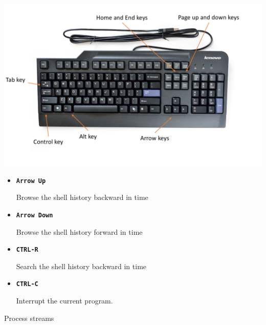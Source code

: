 \documentclass[aspectratio=1610]{beamer}
\newcommand\curtitle{}
\newcommand\command[1]{\alert{\textbf{\texttt{#1}}}}
\begin{document}

\begin{frame}[c]{\curtitle}
    \centering\includegraphics[width=\linewidth]{keyboard.png}
\end{frame}


\begin{frame}[c]{\curtitle}
    \begin{itemize}
        \item \command{Arrow Up}

            Browse the shell history backward in time
        \item \command{Arrow Down}

            Browse the shell history forward in time
        \item \command{CTRL-R}

            Search the shell history backward in time
        \item \command{CTRL-C}

            Interrupt the current program.
    \end{itemize}
\end{frame}

\renewcommand\curtitle{Process streams}

\begin{frame}[c]
    \Huge \curtitle
\end{frame}
\end{document}
